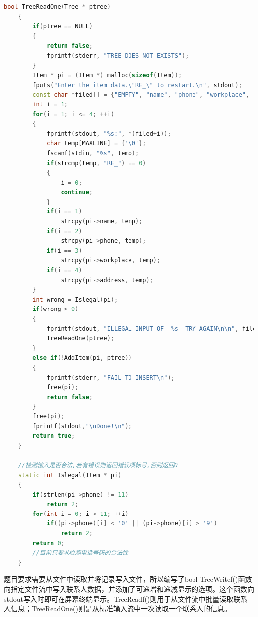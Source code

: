 \documentclass[12pt, a4paper, oneside]{ctexart}
\begin{document}
\begin{framed}
\begin{lstlisting}[language=C++]
    bool TreeReadOne(Tree * ptree)
    {
        if(ptree == NULL)
        {
            return false;
            fprintf(stderr, "TREE DOES NOT EXISTS");
        }
        Item * pi = (Item *) malloc(sizeof(Item));
        fputs("Enter the item data.\"RE_\" to restart.\n", stdout);
        const char *filed[] = {"EMPTY", "name", "phone", "workplace", "address"};
        int i = 1;
        for(i = 1; i <= 4; ++i)
        {
            fprintf(stdout, "%s:", *(filed+i));        
            char temp[MAXLINE] = {'\0'};
            fscanf(stdin, "%s", temp);
            if(strcmp(temp, "RE_") == 0)
            {
                i = 0;
                continue;
            }
            if(i == 1)
                strcpy(pi->name, temp);
            if(i == 2)
                strcpy(pi->phone, temp);
            if(i == 3)
                strcpy(pi->workplace, temp);
            if(i == 4)
                strcpy(pi->address, temp);
        }
        int wrong = Islegal(pi);
        if(wrong > 0)
        {
            fprintf(stdout, "ILLEGAL INPUT OF _%s_ TRY AGAIN\n\n", filed[wrong]);
            TreeReadOne(ptree);
        }
        else if(!AddItem(pi, ptree))
        {
            fprintf(stderr, "FAIL TO INSERT\n");
            free(pi);
            return false;
        }
        free(pi);
        fprintf(stdout,"\nDone!\n");
        return true;
    }
    
    //检测输入是否合法,若有错误则返回错误项标号,否则返回0
    static int Islegal(Item * pi)
    {
        if(strlen(pi->phone) != 11)
            return 2;
        for(int i = 0; i < 11; ++i)
            if((pi->phone)[i] < '0' || (pi->phone)[i] > '9')
                return 2;
        return 0;
        //目前只要求检测电话号码的合法性
    }
\end{lstlisting}
\end{framed}
题目要求需要从文件中读取并将记录写入文件，所以编写了bool TreeWritef()函数向指定文件流中写入联系人数据，并添加了可递增和递减显示的选项。这个函数向stdout写入时即可在屏幕终端显示。TreeReadf()则用于从文件流中批量读取联系人信息；TreeReadOne()则是从标准输入流中一次读取一个联系人的信息。
\end{document}
